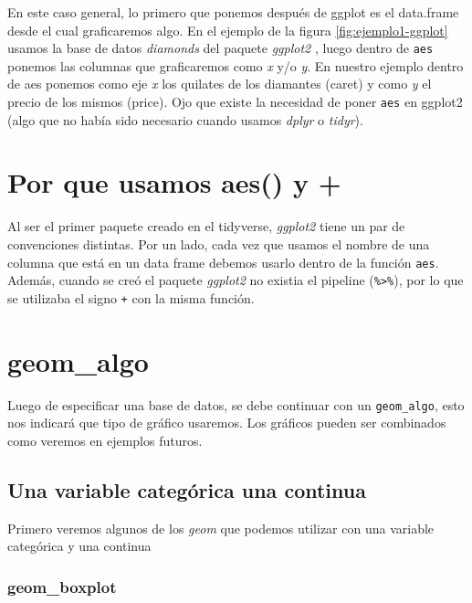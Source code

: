 \documentclass[]{book}
\begin{document}
En este caso general, lo primero que ponemos después de ggplot es el
data.frame desde el cual graficaremos algo. En el ejemplo de la figura
\ref{fig:ejemplo1-ggplot} usamos la base de datos \emph{diamonds} del
paquete \emph{ggplot2} \citep{Wickhamggplot}, luego dentro de
\texttt{aes} ponemos las columnas que graficaremos como \emph{x} y/o
\emph{y}. En nuestro ejemplo dentro de aes ponemos como eje \emph{x} los
quilates de los diamantes (caret) y como \emph{y} el precio de los
mismos (price). Ojo que existe la necesidad de poner \texttt{aes} en
ggplot2 (algo que no había sido necesario cuando usamos \emph{dplyr} o
\emph{tidyr}).

\hypertarget{por-que-usamos-aes-y}{%
\section{Por que usamos aes() y +}\label{por-que-usamos-aes-y}}

Al ser el primer paquete creado en el tidyverse, \emph{ggplot2} tiene un
par de convenciones distintas. Por un lado, cada vez que usamos el
nombre de una columna que está en un data frame debemos usarlo dentro de
la función \texttt{aes}. Además, cuando se creó el paquete
\emph{ggplot2} no existia el pipeline (\texttt{\%\textgreater{}\%}), por
lo que se utilizaba el signo \texttt{+} con la misma función.

\hypertarget{geom_algo}{%
\section{geom\_algo}\label{geom_algo}}

Luego de especificar una base de datos, se debe continuar con un
\texttt{geom\_algo}, esto nos indicará que tipo de gráfico usaremos. Los
gráficos pueden ser combinados como veremos en ejemplos futuros.

\hypertarget{una-variable-categorica-una-continua}{%
\subsection{Una variable categórica una
continua}\label{una-variable-categorica-una-continua}}

Primero veremos algunos de los \emph{geom} que podemos utilizar con una
variable categórica y una continua

\hypertarget{geom_boxplot}{%
\subsubsection{geom\_boxplot}\label{geom_boxplot}}
\end{document}
